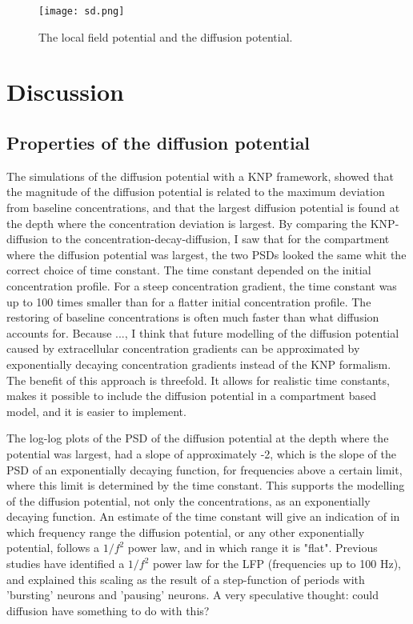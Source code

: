 \documentclass{article}
\begin{document}
\begin{figure}
  \texttt{[image: sd.png]}
  \caption{The local field potential and the diffusion potential. }
  \label{fig:sd}
\end{figure}



\section{Discussion}


\subsection{Properties of the diffusion potential}
The simulations of the diffusion potential with a KNP framework, showed that the magnitude of the diffusion potential is related to the maximum deviation from baseline concentrations, and that the largest diffusion potential is found at the depth where the concentration deviation is largest. By comparing the KNP-diffusion to the concentration-decay-diffusion, I saw that for the compartment where the diffusion potential was largest, the two PSDs looked the same whit the correct choice of time constant. The time constant depended on the initial concentration profile. For a steep concentration gradient, the time constant was up to 100 times smaller than for a flatter initial concentration profile. The restoring of baseline concentrations is often much faster than what diffusion accounts for. Because ..., I think that future modelling of the diffusion potential caused by extracellular concentration gradients can be approximated by exponentially decaying concentration gradients instead of the KNP formalism. The benefit of this approach is threefold. It allows for realistic time constants, makes it possible to include the diffusion potential in a compartment based model, and it is easier to implement.


The log-log plots of the PSD of the diffusion potential at the depth where the potential was largest, had a slope of approximately -2, which is the slope of the PSD of an exponentially decaying function, for frequencies above a certain limit, where this limit is determined by the time constant. This supports the modelling of the diffusion potential, not only the concentrations, as an exponentially decaying function. An estimate of the time constant will give an indication of in which frequency range the diffusion potential, or any other exponentially potential, follows a $1/f^2$ power law, and in which range it is "flat". Previous studies have identified a  $1/f^2$ power law for the LFP (frequencies up to 100 Hz), and explained this scaling as the result of a step-function of periods with 'bursting' neurons and 'pausing' neurons. A very speculative thought: could diffusion have something to do with this? 
\end{document}
